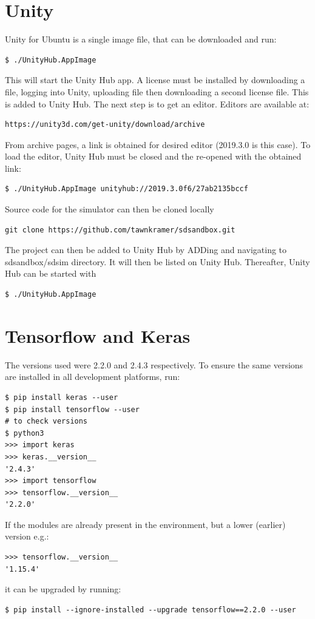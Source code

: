 \section{Unity}
Unity for Ubuntu is a single image file, that can be downloaded and run:
\begin{verbatim}
$ ./UnityHub.AppImage    
\end{verbatim}
This will start the Unity Hub app. A license must be installed by downloading a file, logging into Unity, uploading file then downloading a second license file. This is added to Unity Hub. The next step is to get an editor. Editors are available at:
\begin{verbatim}
https://unity3d.com/get-unity/download/archive    
\end{verbatim}
From archive pages, a link is obtained for desired editor (2019.3.0 is this case).
To load the editor, Unity Hub must be closed and the re-opened with the obtained link:
\begin{verbatim}
$ ./UnityHub.AppImage unityhub://2019.3.0f6/27ab2135bccf
\end{verbatim}
Source code for the simulator can then be cloned locally
\begin{verbatim}
git clone https://github.com/tawnkramer/sdsandbox.git    
\end{verbatim}
The project can then be added to Unity Hub by ADDing and navigating to sdsandbox/sdsim directory. It will then be listed on Unity Hub. Thereafter, Unity Hub can be started with
\begin{verbatim}
$ ./UnityHub.AppImage    
\end{verbatim}

\section{Tensorflow and Keras}
\label{methods:tensorflow-keras}
The versions used were 2.2.0 and 2.4.3 respectively. To ensure the same versions are installed in all development platforms, run:
\begin{verbatim}
$ pip install keras --user
$ pip install tensorflow --user
# to check versions
$ python3
>>> import keras
>>> keras.__version__
'2.4.3'
>>> import tensorflow
>>> tensorflow.__version__
'2.2.0'
\end{verbatim}
If the modules are already present in the environment, but a lower (earlier) version e.g.:
\begin{verbatim}
>>> tensorflow.__version__
'1.15.4'    
\end{verbatim}
it can be upgraded by running:
\begin{verbatim}
$ pip install --ignore-installed --upgrade tensorflow==2.2.0 --user
\end{verbatim}

